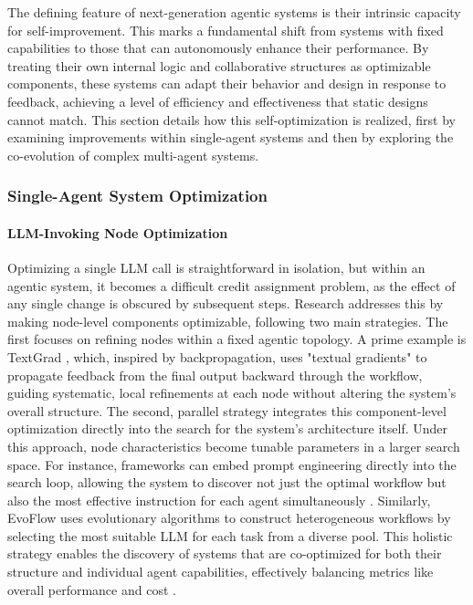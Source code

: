 \documentclass[10pt]{article} %
\begin{document}
The defining feature of next-generation agentic systems is their intrinsic capacity for self-improvement. This marks a fundamental shift from systems with fixed capabilities to those that can autonomously enhance their performance\citep{liu2025advances}. By treating their own internal logic and collaborative structures as optimizable components, these systems can adapt their behavior and design in response to feedback, achieving a level of efficiency and effectiveness that static designs cannot match. 
This section details how this self-optimization is realized, first by examining improvements within single-agent systems and then by exploring the co-evolution of complex multi-agent systems.



\subsubsection{Single-Agent System Optimization}

\paragraph{LLM-Invoking Node Optimization}

Optimizing a single LLM call is straightforward in isolation, but within an agentic system, it becomes a difficult credit assignment problem, as the effect of any single change is obscured by subsequent steps. Research addresses this by making node-level components optimizable, following two main strategies. The first focuses on refining nodes within a fixed agentic topology. A prime example is TextGrad \citep{yellamraju2024textgrad}, which, inspired by backpropagation, uses "textual gradients" to propagate feedback from the final output backward through the workflow, guiding systematic, local refinements at each node without altering the system's overall structure. The second, parallel strategy integrates this component-level optimization directly into the search for the system's architecture itself. Under this approach, node characteristics become tunable parameters in a larger search space. For instance, frameworks can embed prompt engineering directly into the search loop, allowing the system to discover not just the optimal workflow but also the most effective instruction for each agent simultaneously \citep{zhou2025maasprompt}. Similarly, EvoFlow \citep{zhang2025evoflow} uses evolutionary algorithms to construct heterogeneous workflows by selecting the most suitable LLM for each task from a diverse pool. This holistic strategy enables the discovery of systems that are co-optimized for both their structure and individual agent capabilities, effectively balancing metrics like overall performance and cost \citep{ye2025xmas}.
\end{document}
